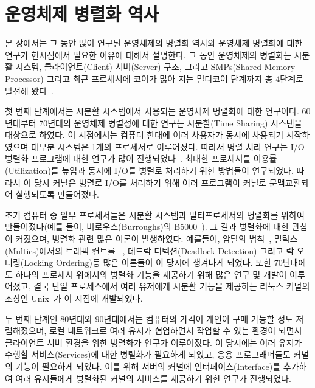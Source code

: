 \section{운영체제 병렬화 역사}
본 장에서는 그 동안 많이 연구된 운영체제의 병렬화 역사와 운영체제 병렬화에 대한 연구가 
현시점에서 필요한 이유에 대해서 설명한다.
그 동안 운영체제의 병렬화는 시분활 시스템, 클라이언트(Client) 서버(Server) 구조, 그리고 SMPs(Shared Memory
Processor) 그리고 최근 프로세서에 코어가 많아 지는 멀티코어 단계까지 총 4단계로 발전해
왔다~\cite{Kaashoek2015PCO}.

첫 번째 단계에서는 시분활 시스템에서 사용되는 운영체제 병렬화에 대한 연구이다. 
60년대부터 70년대의 운영체제 병렬성에 대한 연구는 시분할(Time Sharing) 시스템을 대상으로 하였다.
이 시점에서는 컴퓨터 한대에 여러 사용자가 동시에 사용되기 시작하였으며 대부분 시스템은 1개의 프로세서로 이루어졌다.
따라서 병렬 처리 연구는 I/O 병렬화 프로그램에 대한 연구가 많이 진행되었다~\cite{Bloch1959EDS}.
최대한 프로세서를 이용률(Utilization)를 높임과 동시에 I/O를 병렬로 처리하기 위한 방법들이 연구되었다.
따라서 이 당시 커널은 병렬로 I/O를 처리하기 위해 여러 프로그램이 커널로 문맥교환되어 실행되도록 만들어졌다.
 
초기 컴퓨터 중 일부 프로세서들은 시분활 시스템과 멀티프로세서의 병렬화를 위하여 만들어졌다(예를 들어, 버로우스(Burroughs)의 B5000~\cite{Mayer1982ABB}).
그 결과 병렬화에 대한 관심이 커졌으며, 
병렬화 관련 많은 이론이 발생하였다. 
예를들어, 암달의 법칙~\cite{Amdahl1967VSP}, 멀틱스(Multics)에서의 트래픽 컨트롤
~\cite{Saltzer1966TCM}, 데드락 디텍션(Deadlock Detection) 그리고 락 오더링(Locking
Ordering)등 많은 이론들이 이 당시에 생겨나게 되었다. 
또한 70년대에도 하나의 프로세서 위에서의 병렬화 기능을 제공하기 위해 많은 연구 및 개발이 이루어졌고, 
결국 단일 프로세스에서 여러 유저에게 시분활 기능을 제공하는 리눅스 커널의 
조상인 Unix~\cite{Ritchie1973UTS}가 이 시점에 개발되었다.

두 번째 단계인 80년대와 90년대에서는 컴퓨터의 가격이 개인이 구매 가능할 정도 저렴해졌으며,
로컬 네트워크로 여러 유저가 협업하면서 작업할 수 있는 환경이 되면서 클라이언트 서버 환경을 위한 
병렬화가 연구가 이루어졌다.
이 당시에는 여러 유저가 수행할 서비스(Services)에 대한 병렬화가 필요하게 되었고, 
응용 프로그래머들도 커널의 기능이 필요하게 되었다.
이를 위해 서버의 커널에 인터페이스(Interface)를 추가하여 여러 유저들에게 병렬화된 
커널의 서비스를 제공하기 위한 연구가 진행되었다.
 

